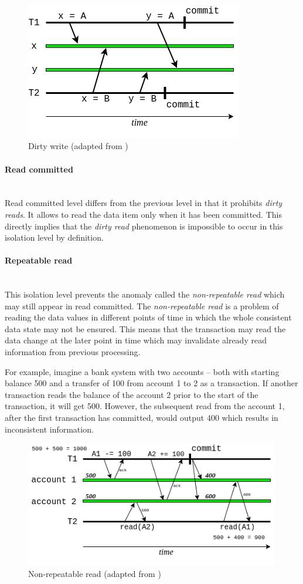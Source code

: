 \documentclass[oneside,
  digital, %
  table,   %
  lof,     %
  lot,     %
]{fithesis3}
\newcommand{\newlinepar}[1]{\paragraph{#1}\needspace{3\baselineskip}\mbox{}\\}
\begin{document}
\hfill \break

\begin{figure}[h]
    \begin{center}
        \includegraphics[height=60mm]{images/dirtywrite.png}
    \end{center}
    \caption{Dirty write (adapted from \cite{isolation_levels})}
\end{figure}


\newlinepar{Read committed}

Read committed level differs from the previous level in that it prohibits \textit{dirty reads}. It allows to read the data item only when it has been committed. This directly implies that the \textit{dirty read} phenomenon is impossible to occur in this isolation level by definition.


\newlinepar{Repeatable read}

This isolation level prevents the anomaly called the \textit{non-repeatable read} which may still appear in read committed. The \textit{non-repeatable read} is a problem of reading the data values in different points of time in which the whole consistent data state may not be ensured. This means that the transaction may read the data change at the later point in time which may invalidate already read information from previous processing.

For example, imagine a bank system with two accounts -- both with starting balance 500 and a transfer of 100 from account 1 to 2 as a transaction. If another transaction reads the balance of the account 2 prior to the start of the transaction, it will get 500. However, the subsequent read from the account 1, after the first transaction has committed, would output 400 which results in inconsistent information.

\begin{figure}[h]
    \begin{center}
        \includegraphics[height=55mm]{images/nonrepeatableread.png}
    \end{center}
    \caption{Non-repeatable read (adapted from \cite{isolation_levels})}
\end{figure}
\end{document}

